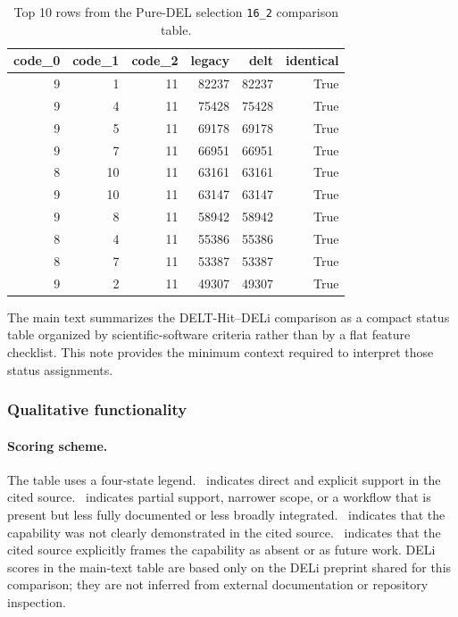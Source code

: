\documentclass[pdflatex,sn-nature]{sn-jnl}
\begin{document}
\begin{table}[htbp]
\centering
\small
\caption{Top 10 rows from the Pure-DEL selection \texttt{16\_2} comparison table.}
\label{tab:puredel-example}
\begin{tabular}{rrrrrr}
\toprule
\textbf{code\_0} & \textbf{code\_1} & \textbf{code\_2} & \textbf{legacy} & \textbf{delt} & \textbf{identical} \\
\midrule
9 & 1 & 11 & 82237 & 82237 & True \\
9 & 4 & 11 & 75428 & 75428 & True \\
9 & 5 & 11 & 69178 & 69178 & True \\
9 & 7 & 11 & 66951 & 66951 & True \\
8 & 10 & 11 & 63161 & 63161 & True \\
9 & 10 & 11 & 63147 & 63147 & True \\
9 & 8 & 11 & 58942 & 58942 & True \\
8 & 4 & 11 & 55386 & 55386 & True \\
8 & 7 & 11 & 53387 & 53387 & True \\
9 & 2 & 11 & 49307 & 49307 & True \\
\bottomrule
\end{tabular}
\end{table}

\label{supp:comparison-delt-deli}

\providecommand{\statusgreen}{\raisebox{0.15ex}{\textcolor{green!50!black}{\LARGE$\bullet$}}}
\providecommand{\statusamber}{\raisebox{0.15ex}{\textcolor{orange!90!black}{\LARGE$\bullet$}}}
\providecommand{\statusopen}{\raisebox{0.15ex}{\textcolor{black!45}{\LARGE$\bullet$}}}
\providecommand{\statusred}{\raisebox{0.15ex}{\textcolor{blue!70!black}{\LARGE$\bullet$}}}

The main text summarizes the DELT-Hit--DELi\cite{wellnitz_opensourcednaencodedlibrary_2025} comparison as a compact status table organized by scientific-software criteria rather than by a flat feature checklist. This note provides the minimum context required to interpret those status assignments.

\subsubsection{Qualitative functionality}

\paragraph{Scoring scheme.}
The table uses a four-state legend. \statusgreen\ indicates direct and explicit support in the cited source. \statusamber\ indicates partial support, narrower scope, or a workflow that is present but less fully documented or less broadly integrated. \statusopen\ indicates that the capability was not clearly demonstrated in the cited source. \statusred\ indicates that the cited source explicitly frames the capability as absent or as future work. DELi scores in the main-text table are based only on the DELi preprint shared for this comparison; they are not inferred from external documentation or repository inspection.
\end{document}

